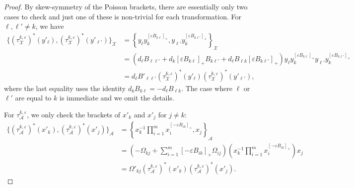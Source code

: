 \documentclass{amsart}
\numberwithin{equation}{section}
\newcommand{\cA}{\mathcal{A}}
\newcommand{\cX}{\mathcal{X}}
\begin{document}
\begin{proof}
  By skew-symmetry of the Poisson brackets, there are essentially only two cases to check and just one of these is non-trivial for each transformation.
  For $\ell,\ell'\ne k$, we have
  \begin{align*}
    \{(\tau_\cX^{k,\varepsilon})^*(y'_\ell),(\tau_\cX^{k,\varepsilon})^*(y'_{\ell'})\}_\cX
    &=\left\{y_\ell y_k^{[\varepsilon B_{k\ell}]_+},y_{\ell'} y_k^{[\varepsilon B_{k\ell'}]_+}\right\}_\cX\\
    &=(d_\ell B_{\ell\ell'}+d_k[\varepsilon B_{k\ell}]_+B_{k\ell'}+d_\ell B_{\ell k}[\varepsilon B_{k\ell'}]_+) y_\ell y_k^{[\varepsilon B_{k\ell}]_+} y_{\ell'} y_k^{[\varepsilon B_{k\ell'}]_+}\\
    &=d_\ell B'_{\ell\ell'} (\tau_\cX^{k,\varepsilon})^*(y'_\ell) (\tau_\cX^{k,\varepsilon})^*(y'_{\ell'}),
  \end{align*}
  where the last equality uses the identity $d_kB_{k\ell}=-d_\ell B_{\ell k}$.
  The case where $\ell$ or $\ell'$ are equal to $k$ is immediate and we omit the details.

  For $\tau_\cA^{k,\varepsilon}$, we only check the brackets of $x'_k$ and $x'_j$ for $j\ne k$:
  \begin{align*}
    \{(\tau_\cA^{k,\varepsilon})^*(x'_k),(\tau_\cA^{k,\varepsilon})^*(x'_j)\}_\cA
    &=\left\{x_k^{-1}\prod\limits_{i=1}^m x_i^{[-\varepsilon B_{ik}]_+},x_j\right\}_\cA\\
    &=\left(-\Omega_{kj}+\sum_{i=1}^m [-\varepsilon B_{ik}]_+\Omega_{ij}\right) \left(x_k^{-1} \prod\limits_{i=1}^m x_i^{[-\varepsilon B_{ik}]_+}\right)x_j\\
    &=\Omega'_{kj} (\tau_\cA^{k,\varepsilon})^*(x'_k) (\tau_\cA^{k,\varepsilon})^*(x'_j).
  \end{align*}
\end{proof}
\end{document}
